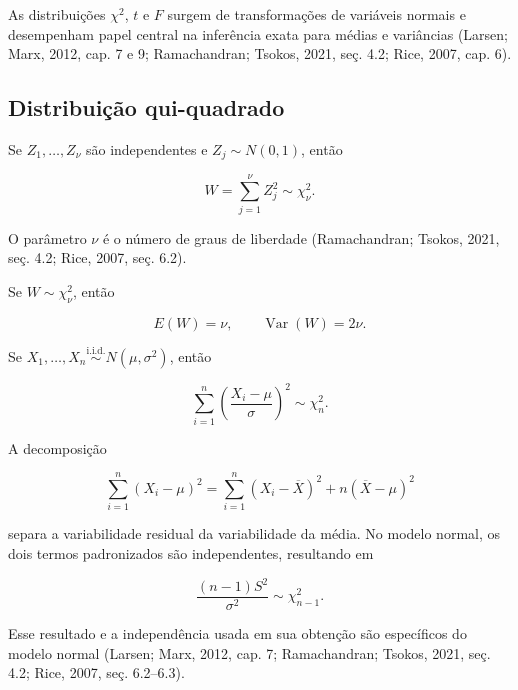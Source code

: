 \documentclass[
  letterpaper,
  DIV=11,
  numbers=noendperiod]{scrreprt}
\begin{document}
As distribuições \(\chi^2\), \(t\) e \(F\) surgem de transformações de
variáveis normais e desempenham papel central na inferência exata para
médias e variâncias (Larsen; Marx, 2012, cap. 7 e 9; Ramachandran;
Tsokos, 2021, seç. 4.2; Rice, 2007, cap. 6).

\subsection{Distribuição
qui-quadrado}\label{distribuiuxe7uxe3o-qui-quadrado}

\begin{tcolorbox}[enhanced jigsaw, colback=white, leftrule=.75mm, colbacktitle=quarto-callout-important-color!10!white, breakable, titlerule=0mm, bottomtitle=1mm, title=\textcolor{quarto-callout-important-color}{\faExclamation}\hspace{0.5em}{Definição --- Distribuição \(\chi^2\)}, colframe=quarto-callout-important-color-frame, toprule=.15mm, opacityback=0, bottomrule=.15mm, opacitybacktitle=0.6, arc=.35mm, toptitle=1mm, rightrule=.15mm, coltitle=black, left=2mm]

Se \(Z_1,\ldots,Z_\nu\) são independentes e \(Z_j\sim N(0,1)\), então

\[W=\sum_{j=1}^{\nu}Z_j^2\sim\chi^2_\nu.\]

O parâmetro \(\nu\) é o número de graus de liberdade (Ramachandran;
Tsokos, 2021, seç. 4.2; Rice, 2007, seç. 6.2).

\end{tcolorbox}

Se \(W\sim\chi^2_\nu\), então

\[E(W)=\nu,
\qquad
\operatorname{Var}(W)=2\nu.\]

Se \(X_1,\ldots,X_n\overset{\mathrm{i.i.d.}}{\sim}N(\mu,\sigma^2)\),
então

\[\sum_{i=1}^n\left(\frac{X_i-\mu}{\sigma}\right)^2
\sim\chi^2_n.\]

A decomposição

\[\sum_{i=1}^n(X_i-\mu)^2
=
\sum_{i=1}^n(X_i-\overline{X})^2
+n(\overline{X}-\mu)^2\]

separa a variabilidade residual da variabilidade da média. No modelo
normal, os dois termos padronizados são independentes, resultando em

\[\frac{(n-1)S^2}{\sigma^2}
\sim\chi^2_{n-1}.\]

Esse resultado e a independência usada em sua obtenção são específicos
do modelo normal (Larsen; Marx, 2012, cap. 7; Ramachandran; Tsokos,
2021, seç. 4.2; Rice, 2007, seç. 6.2--6.3).
\end{document}
